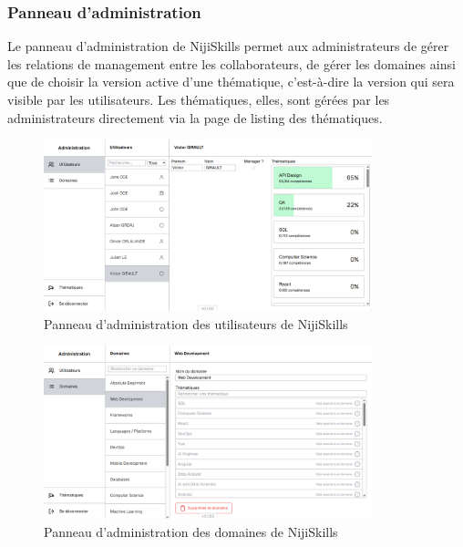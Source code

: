 \documentclass[12pt]{article}
\begin{document}
\subsubsection{Panneau d'administration}
Le panneau d'administration de NijiSkills permet aux administrateurs de gérer les relations de management entre les collaborateurs, de gérer les domaines ainsi que de choisir la version active d'une thématique, c'est-à-dire la version qui sera visible par les utilisateurs. Les thématiques, elles, sont gérées par les administrateurs directement via la page de listing des thématiques.
\begin{figure}[H]
    \centering
    \includegraphics[width=0.85\textwidth]{img/admin-user.png} 
    \caption{Panneau d'administration des utilisateurs de NijiSkills}
\end{figure}

\begin{figure}[H]
    \centering
    \includegraphics[width=0.85\textwidth]{img/admin-domain.png}
    \caption{Panneau d'administration des domaines de NijiSkills}
\end{figure}
\end{document}
